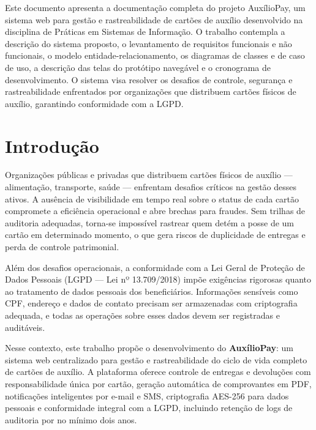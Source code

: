 \documentclass[
  article,
  a4paper,
  12pt,
  oneside,
  fleqn
]{abntex2}
\begin{document}
\pretextual

\begin{paginadetitulo}
    \begin{ambienteresumo}
        Este documento apresenta a documentação completa do projeto AuxílioPay, um sistema web para gestão e rastreabilidade de cartões de auxílio desenvolvido na disciplina de Práticas em Sistemas de Informação. O trabalho contempla a descrição do sistema proposto, o levantamento de requisitos funcionais e não funcionais, o modelo entidade-relacionamento, os diagramas de classes e de caso de uso, a descrição das telas do protótipo navegável e o cronograma de desenvolvimento. O sistema visa resolver os desafios de controle, segurança e rastreabilidade enfrentados por organizações que distribuem cartões físicos de auxílio, garantindo conformidade com a LGPD.
    \end{ambienteresumo}
\end{paginadetitulo}

\textual
\newpage

\section{Introdução}

Organizações públicas e privadas que distribuem cartões físicos de auxílio --- alimentação, transporte, saúde --- enfrentam desafios críticos na gestão desses ativos. A ausência de visibilidade em tempo real sobre o status de cada cartão compromete a eficiência operacional e abre brechas para fraudes. Sem trilhas de auditoria adequadas, torna-se impossível rastrear quem detém a posse de um cartão em determinado momento, o que gera riscos de duplicidade de entregas e perda de controle patrimonial.

Além dos desafios operacionais, a conformidade com a Lei Geral de Proteção de Dados Pessoais (LGPD --- Lei nº 13.709/2018) impõe exigências rigorosas quanto ao tratamento de dados pessoais dos beneficiários. Informações sensíveis como CPF, endereço e dados de contato precisam ser armazenadas com criptografia adequada, e todas as operações sobre esses dados devem ser registradas e auditáveis.

Nesse contexto, este trabalho propõe o desenvolvimento do \textbf{AuxílioPay}: um sistema web centralizado para gestão e rastreabilidade do ciclo de vida completo de cartões de auxílio. A plataforma oferece controle de entregas e devoluções com responsabilidade única por cartão, geração automática de comprovantes em PDF, notificações inteligentes por e-mail e SMS, criptografia AES-256 para dados pessoais e conformidade integral com a LGPD, incluindo retenção de logs de auditoria por no mínimo dois anos.
\end{document}
